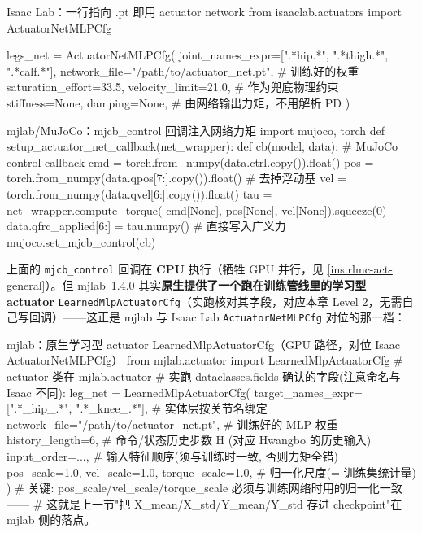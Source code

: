 \begin{codebox}[Python]{Isaac Lab：一行指向 .pt 即用 actuator network}
from isaaclab.actuators import ActuatorNetMLPCfg

legs_net = ActuatorNetMLPCfg(
    joint_names_expr=[".*hip.*", ".*thigh.*", ".*calf.*"],
    network_file="/path/to/actuator_net.pt",  # 训练好的权重
    saturation_effort=33.5, velocity_limit=21.0,  # 作为兜底物理约束
    stiffness=None, damping=None,             # 由网络输出力矩，不用解析 PD
)
\end{codebox}

\begin{codebox}[Python]{mjlab/MuJoCo：mjcb\_control 回调注入网络力矩}
import mujoco, torch
def setup_actuator_net_callback(net_wrapper):
    def cb(model, data):                       # MuJoCo control callback
        cmd = torch.from_numpy(data.ctrl.copy()).float()
        pos = torch.from_numpy(data.qpos[7:].copy()).float()  # 去掉浮动基
        vel = torch.from_numpy(data.qvel[6:].copy()).float()
        tau = net_wrapper.compute_torque(
            cmd[None], pos[None], vel[None]).squeeze(0)
        data.qfrc_applied[6:] = tau.numpy()    # 直接写入广义力
    mujoco.set_mjcb_control(cb)
\end{codebox}

\noindent 上面的 \verb|mjcb_control| 回调在 \textbf{CPU} 执行（牺牲 GPU 并行，见 \cref{ins:rlmc-act-general}）。但 mjlab~1.4.0 其实\textbf{原生提供了一个跑在训练管线里的学习型 actuator} \verb|LearnedMlpActuatorCfg|（实跑核对其字段，对应本章 Level 2，无需自己写回调）——这正是 mjlab 与 Isaac Lab \verb|ActuatorNetMLPCfg| 对位的那一档：

\begin{codebox}[Python]{mjlab：原生学习型 actuator LearnedMlpActuatorCfg（GPU 路径，对位 Isaac ActuatorNetMLPCfg）}
from mjlab.actuator import LearnedMlpActuatorCfg     # actuator 类在 mjlab.actuator
# 实跑 dataclasses.fields 确认的字段(注意命名与 Isaac 不同):
leg_net = LearnedMlpActuatorCfg(
    target_names_expr=[".*_hip_.*", ".*_knee_.*"],   # 实体层按关节名绑定
    network_file="/path/to/actuator_net.pt",         # 训练好的 MLP 权重
    history_length=6,        # 命令/状态历史步数 H (对应 Hwangbo 的历史输入)
    input_order=...,         # 输入特征顺序(须与训练时一致, 否则力矩全错)
    pos_scale=1.0, vel_scale=1.0, torque_scale=1.0,  # 归一化尺度(= 训练集统计量)
)
# 关键: pos_scale/vel_scale/torque_scale 必须与训练网络时用的归一化一致——
# 这就是上一节"把 X_mean/X_std/Y_mean/Y_std 存进 checkpoint"在 mjlab 侧的落点。
\end{codebox}

